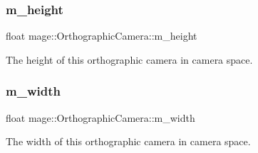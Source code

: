 \subsubsection{\texorpdfstring{m\+\_\+height}{m\_height}}
{\footnotesize\ttfamily float mage\+::\+Orthographic\+Camera\+::m\+\_\+height\hspace{0.3cm}{\ttfamily [private]}}

The height of this orthographic camera in camera space. \hypertarget{classmage_1_1_orthographic_camera_aadef4cff19cc1b1ecf427f82bbc3ea6a}{}\label{classmage_1_1_orthographic_camera_aadef4cff19cc1b1ecf427f82bbc3ea6a} 
\subsubsection{\texorpdfstring{m\+\_\+width}{m\_width}}
{\footnotesize\ttfamily float mage\+::\+Orthographic\+Camera\+::m\+\_\+width\hspace{0.3cm}{\ttfamily [private]}}

The width of this orthographic camera in camera space. 